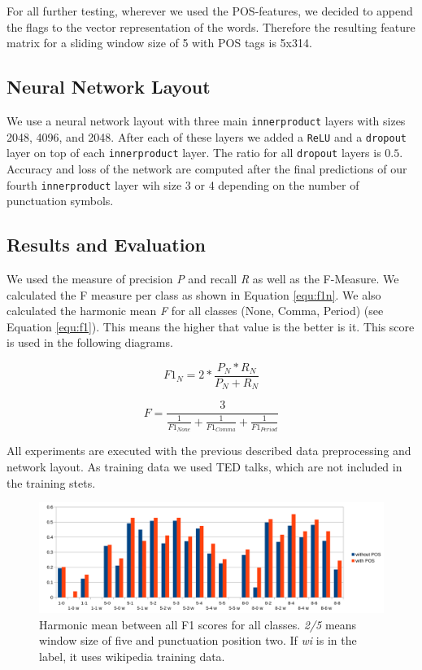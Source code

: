 For all further testing, wherever we used the POS-features, we decided to append the flags to the vector representation of the words.
Therefore the resulting feature matrix for a sliding window size of 5 with POS tags is 5x314.



\subsection{Neural Network Layout}

We use a neural network layout with three main \texttt{innerproduct} layers with sizes 2048, 4096, and 2048.
After each of these layers we added a \texttt{ReLU} and a \texttt{dropout} layer on top of each \texttt{innerproduct} layer.
The ratio for all \texttt{dropout} layers is $0.5$.
Accuracy and loss of the network are computed after the final predictions of our fourth \texttt{innerproduct} layer wih size 3 or 4 depending on the number of punctuation symbols.

\subsection{Results and Evaluation}

We used the measure of precision \emph{P} and recall \emph{R} as well as the F-Measure. We calculated the F measure per class as shown in Equation \ref{equ:f1n}.
We also calculated the harmonic mean \emph{F} for all classes (None, Comma, Period) (see Equation \ref{equ:f1}). This means the higher that value is the better is it. This score is used in the following diagrams.

\begin{equation}
\label{equ:f1n}
F1_{N} = 2 * \frac{P_{N}* R_{N}}{P_{N}+R_{N}}
\end{equation}

\begin{equation}
\label{equ:f1}
F = \frac{3}{\frac{1}{F1_{None}} + \frac{1}{F1_{Comma}} + \frac{1}{F1_{Period}}}
\end{equation}

All experiments are executed with the previous described data preprocessing and network layout.
As training data we used TED talks, which are not included in the training stets.

\begin{figure}[ht]
    \centering
    \includegraphics[width=\textwidth]{img/window_eval.png}
    \caption{Harmonic mean between all F1 scores for all classes. \emph{2/5} means window size of five and punctuation position two. If \emph{wi} is in the label, it uses wikipedia training data.}
    \label{fig:window_eval}
\end{figure}

